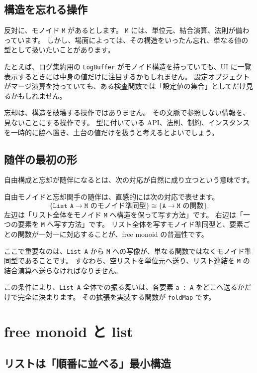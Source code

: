 \subsection{構造を忘れる操作}

反対に、モノイド \texttt{M} があるとします。
\texttt{M} には、単位元、結合演算、法則が備わっています。
しかし、場面によっては、その構造をいったん忘れ、単なる値の型として扱いたいことがあります。

たとえば、ログ集約用の \texttt{LogBuffer} がモノイド構造を持っていても、UI に一覧表示するときには中身の値だけに注目するかもしれません。
設定オブジェクトがマージ演算を持っていても、ある検査関数では「設定値の集合」としてだけ見るかもしれません。

忘却は、構造を破壊する操作ではありません。
その文脈で参照しない情報を、見ないことにする操作です。
型に付いている API、法則、制約、インスタンスを一時的に脇へ置き、土台の値だけを扱うと考えるとよいでしょう。

\subsection{随伴の最初の形}

自由構成と忘却が随伴になるとは、次の対応が自然に成り立つという意味です。

自由モノイドと忘却関手の随伴は、直感的には次の対応で表せます。
\[
  \{\texttt{List A} \to \texttt{M} \text{ のモノイド準同型}\}
  \cong
  \{\texttt{A} \to \texttt{M} \text{ の関数}\}.
\]
左辺は「リスト全体をモノイド \texttt{M} へ構造を保って写す方法」です。
右辺は「一つの要素を \texttt{M} へ写す方法」です。
リスト全体を写すモノイド準同型と、要素ごとの関数が一対一に対応することが、free monoid の普遍性です。

ここで重要なのは、\texttt{List A} から \texttt{M} への写像が、単なる関数ではなくモノイド準同型であることです。
すなわち、空リストを単位元へ送り、リスト連結を \texttt{M} の結合演算へ送らなければなりません。

この条件により、\texttt{List A} 全体での振る舞いは、各要素 \texttt{a : A} をどこへ送るかだけで完全に決まります。
その拡張を実装する関数が \texttt{foldMap} です。

\section{free monoid と list}
\label{sec:ch37-free-monoid-list}

\subsection{リストは「順番に並べる」最小構造}


